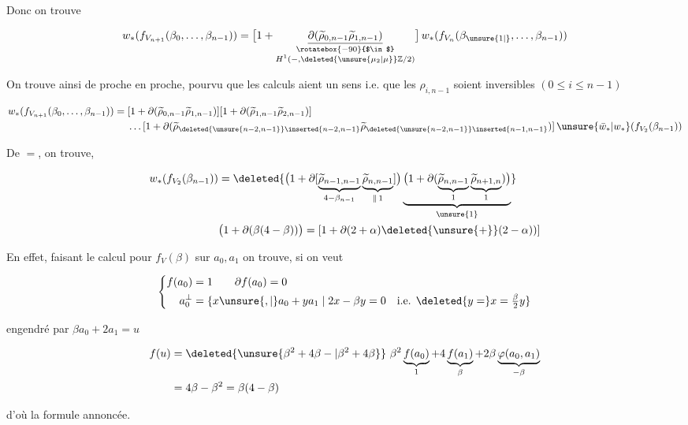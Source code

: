 
Donc on trouve

\[w_*(f_{V_{n+1}}(\beta_0,\ldots,\beta_{n-1}))=\bigl[1+\underset{\substack{\rotatebox{-90}{$\in$}\\ H^1(-,\deleted{\unsure{\mu_2|\mu}}\mathbb Z/2)}}{\underline{\partial(\widetilde\rho_{0,n-1}\widetilde\rho_{1,n-1})}}\bigr]\,w_*(f_{V_n}(\beta_{\unsure{1|{}}},\ldots,\beta_{n-1}))\]

On trouve ainsi de proche en proche, pourvu que les calculs aient un sens i.e. que  les $\rho_{i,n-1}$ soient inversibles $(0\leq i\leq n-1)$

\[\begin{aligned}w_*(f_{V_{n+1}}(\beta_0,\ldots,\beta_{n-1}))={}&[1+\partial(\widetilde\rho_{0,n-1}\widetilde\rho_{1,n-1})][1+\partial(\widetilde\rho_{1,n-1}\widetilde\rho_{2,n-1})]\\ &\ldots[1+\partial(\widetilde\rho_{\deleted{\unsure{n-2,n-1}}\inserted{n-2,n-1}}\widetilde\rho_{\deleted{\unsure{n-2,n-1}}\inserted{n-1,n-1}})]\,\unsure{\bar w_*|w_*}(f_{V_2}(\beta_{n-1}))\end{aligned}\]

De $=$, on trouve,

\[\begin{aligned}w_*(f_{V_2}(\beta_{n-1}))&=\deleted{\bigl(1+\partial[\underbrace{\widetilde\rho_{n-1,n-1}}_{4-\beta_{n-1}}\underbrace{\widetilde\rho_{n,n-1}}_{\Vert\,1}]\bigr)\underbrace{\bigl(1+\partial(\underbrace{\widetilde\rho_{n,n-1}}_{1}\underbrace{\widetilde\rho_{n+1,n}}_{1})\bigr)}_{\unsure{1}}}\\ &\bigl(1+\partial(\beta(4-\beta))\bigr)=[1+\partial(2+\alpha)\deleted{\unsure{+}}(2-\alpha))]\end{aligned}\]

En effet, faisant le calcul pour $f_V(\beta)$ sur $a_0,a_1$ on trouve, si on veut

\[\left\{\begin{aligned}f(a_0)&=1\qquad\partial f(a_0)=0\\a_0^\perp&=\{x\unsure{,|{}}a_0+ya_1\mid 2x-\beta y=0\quad\text{i.e. }\deleted{y=}x=\tfrac\beta2y\}\end{aligned}\right.\]

engendré par $\beta a_0+2a_1=u$

\[\begin{aligned}f(u)&=\deleted{\unsure{\beta^2+4\beta-|\beta^2+4\beta}}\ \beta^2\underbrace{f(a_0)}_1+4\underbrace{f(a_1)}_\beta+2\beta\underbrace{\varphi(a_0,a_1)}_{-\beta}\\ &=4\beta-\beta^2=\beta(4-\beta)\end{aligned}\]

d'où  la formule annoncée.

